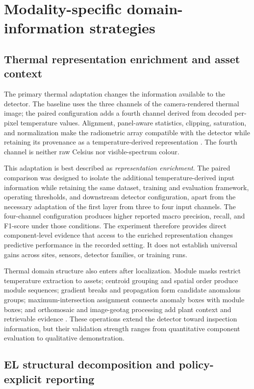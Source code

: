 \documentclass[12pt,a4paper]{report}
\begin{document}
\section{Modality-specific domain-information strategies}
\label{sec:ch07-specific-strategies}

\subsection{Thermal representation enrichment and asset context}

The primary thermal adaptation changes the information available to the detector. The baseline uses the three channels of the camera-rendered thermal image; the paired configuration adds a fourth channel derived from decoded per-pixel temperature values. Alignment, panel-aware statistics, clipping, saturation, and normalization make the radiometric array compatible with the detector while retaining its provenance as a temperature-derived representation \citep{src004}. The fourth channel is neither raw Celsius nor visible-spectrum colour.

This adaptation is best described as \emph{representation enrichment}. The paired comparison was designed to isolate the additional temperature-derived input information while retaining the same dataset, training and evaluation framework, operating thresholds, and downstream detector configuration, apart from the necessary adaptation of the first layer from three to four input channels. The four-channel configuration produces higher reported macro precision, recall, and F1-score under those conditions. The experiment therefore provides direct component-level evidence that access to the enriched representation changes predictive performance in the recorded setting. It does not establish universal gains across sites, sensors, detector families, or training runs.

Thermal domain structure also enters after localization. Module masks restrict temperature extraction to assets; centroid grouping and spatial order produce module sequences; gradient breaks and propagation form candidate anomalous groups; maximum-intersection assignment connects anomaly boxes with module boxes; and orthomosaic and image-geotag processing add plant context and retrievable evidence \citep{src003,src005}. These operations extend the detector toward inspection information, but their validation strength ranges from quantitative component evaluation to qualitative demonstration.

\subsection{EL structural decomposition and policy-explicit reporting}
\end{document}
